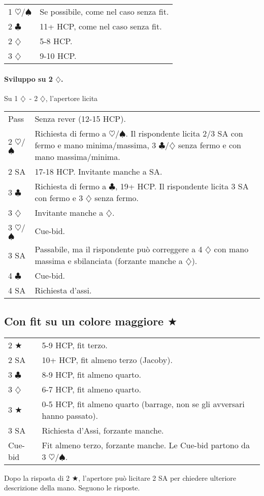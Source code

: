 \documentclass[a4paper,10pt]{article}
\renewcommand{\c}{$\clubsuit$\xspace}
\renewcommand{\d}{$\diamondsuit$\xspace}
\newcommand{\h}{$\heartsuit$\xspace}
\newcommand{\s}{$\spadesuit$\xspace}
\renewcommand{\j}{$\bigstar$\xspace}
\newcommand{\sa}{SA\xspace}
\newcommand{\smallspace}{\vskip0.3cm}
\newcommand{\note}[1]{\textcolor{red}{#1}}
\newenvironment{twocol}
  {\smallspace\noindent\begin{tabular}{l p{0.78\textwidth}}}
  {\end{tabular}\smallspace}
\begin{document}
\begin{twocol}
	1 \h/\s & Se possibile, come nel caso senza fit.\\
	2 \c  & 11+ HCP, come nel caso senza fit.\\
	2 \d  & 5-8 HCP.\\
	3 \d  & 9-10 HCP.\\
\end{twocol}

\paragraph{Sviluppo su 2 \d.}
Su 1 \d\ - 2 \d, l'apertore licita
\begin{twocol}
	Pass & Senza rever (12-15 HCP).\\
	2 \h/\s & Richiesta di fermo a \h/\s. Il rispondente licita 2/3 \sa con fermo e mano minima/massima, 3 \c/\d senza fermo e con mano massima/minima.\\
	2 \sa & 17-18 HCP. Invitante manche a \sa.\\
	3 \c & Richiesta di fermo a \c, 19+ HCP. Il rispondente licita 3 \sa con fermo e 3 \d senza fermo.\\
	3 \d & Invitante manche a \d.\\
	3 \h/\s & Cue-bid.\\
	3 \sa & Passabile, ma il rispondente può correggere a 4 \d con mano massima e sbilanciata (forzante manche a \d).\\
	4 \c & Cue-bid.\\
	4 \sa & Richiesta d'assi.
\end{twocol}

\subsection{Con fit su un colore maggiore \j}
\begin{twocol}
	2 \j  & 5-9 HCP, fit terzo.\\ 
	2 \sa & 10+ HCP, fit almeno terzo (Jacoby).\\
	3 \c  & 8-9 HCP, fit almeno quarto.\\
	3 \d  & 6-7 HCP, fit almeno quarto.\\
	3 \j  & 0-5 HCP, fit almeno quarto (barrage, non se gli avversari hanno passato).\\
	3 \sa & Richiesta d'Assi, forzante manche. \\
	Cue-bid & Fit almeno terzo, forzante manche. Le Cue-bid partono da 3 \h/\s.
\end{twocol}
Dopo la risposta di 2 \j, l'apertore può licitare 2 \sa per chiedere ulteriore descrizione della mano. Seguono le risposte.
\end{document}
